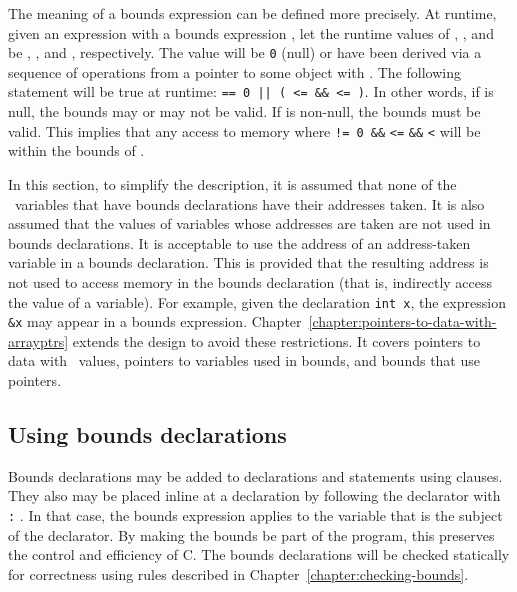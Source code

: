 The meaning of a bounds expression can be defined more precisely. At
runtime, given an expression  with a bounds expression
, let the runtime
values of , , and  be , ,
and , respectively. The value  will be \texttt{0} (null) or
have been derived via a sequence of operations from a pointer to some
object  with .
The following statement will be true at runtime:
 \texttt{== 0 || ( <= \&\& 
 <= )}. In other words, 
if  is null, the bounds
may or may not be valid. If  is non-null, the bounds must be
valid. This implies that any access to memory where  \texttt{!=
0 \&\&}  \texttt{<=}  \texttt{\&\&} 
\texttt{<}  will be within the bounds of .

In this section, to simplify the description, it is assumed that none of
the \arrayptr\ variables that have bounds declarations have
their addresses taken. It is also assumed that the values of variables
whose addresses are taken are not used in bounds declarations. It is
acceptable to use the address of an address-taken variable in a bounds
declaration. This is provided that the resulting address is not used to
access memory in the bounds declaration (that is, indirectly access the
value of a variable). For example, given the declaration \texttt{int x},
the expression \texttt{\&x} may appear in a bounds expression.  
Chapter~\ref{chapter:pointers-to-data-with-arrayptrs} extends the
design to avoid these restrictions.  It covers pointers to data with 
\arrayptr\ values,  pointers to variables used in bounds, and bounds 
that use pointers.

\subsection{Using bounds declarations}

Bounds declarations may be added to declarations and statements using
 clauses. They also may be placed inline at a declaration
by following the declarator with \texttt{:} . In that
case, the bounds expression applies to the variable that is the subject
of the declarator. By making the bounds be part of the program, this
preserves the control and efficiency of C. The bounds declarations will
be checked statically for correctness using rules described in 
Chapter~\ref{chapter:checking-bounds}.

